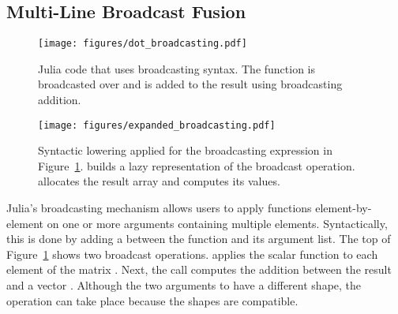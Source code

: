 \subsection{Multi-Line Broadcast Fusion}
\label{sec:multi-line broadcast fusion}
\begin{figure}
    \centering
    \texttt{[image: figures/dot\_broadcasting.pdf]}
    \caption{Julia code that uses broadcasting syntax. The  function is broadcasted over  and  is added to the result using broadcasting addition.}
    \label{fig:broadcast_dot}
\end{figure}
\begin{figure}
    \centering
    \texttt{[image: figures/expanded\_broadcasting.pdf]}
    \caption{Syntactic lowering applied for the broadcasting expression in Figure~\ref{fig:broadcast_dot}.  builds a lazy representation of the broadcast operation.  allocates the result array and computes its values.}
    \label{fig:broadcast_expanded}
\end{figure}

Julia's broadcasting mechanism allows users to apply functions element-by-element on one or more arguments containing multiple elements.
Syntactically, this is done by adding a  between the function and its argument list.
The top of Figure~\ref{fig:broadcast_dot} shows two broadcast operations.
 applies the scalar  function to each element of the matrix .
Next, the  call computes the addition between the result and a vector .
Although the two arguments to  have a different shape, the operation can take place because the shapes are compatible.

